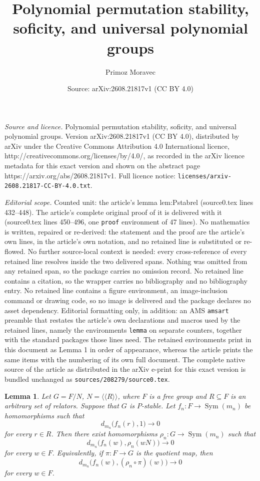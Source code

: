 \documentclass[10pt,a4paper]{amsart}
\title{Polynomial permutation stability, soficity, and universal polynomial groups}
\author{Primoz Moravec}
\date{Source: arXiv:2608.21817v1 (CC BY 4.0)}
\newtheorem{lemma}{Lemma}
\DeclareMathOperator{\Sym}{Sym}
\begin{document}
\maketitle

\noindent\emph{Source and licence.} Polynomial permutation stability, soficity, and universal polynomial groups. Version arXiv:2608.21817v1 (CC BY 4.0), distributed by arXiv under the Creative Commons Attribution 4.0 International licence, http://creativecommons.org/licenses/by/4.0/, as recorded in the arXiv licence metadata for this exact version and shown on the abstract page https://arxiv.org/abs/2608.21817v1. Full licence notice: \texttt{licenses/arxiv-2608.21817-CC-BY-4.0.txt}.\par\smallskip

\noindent\textit{Editorial scope.} Counted unit: the article's lemma lem:Pstabrel (source0.tex lines 432--448). The article's complete original proof of it is delivered with it (source0.tex lines 450--496, one \texttt{proof} environment of 47 lines). No mathematics is written, repaired or re-derived: the statement and the proof are the article's own lines, in the article's own notation, and no retained line is substituted or re-flowed.  No further source-local context is needed: every cross-reference of every retained line resolves inside the two delivered spans.  Nothing was omitted from any retained span, so the package carries no omission record.  No retained line contains a citation, so the wrapper carries no bibliography and no bibliography entry.  No retained line contains a figure environment, an image-inclusion command or drawing code, so no image is delivered and the package declares no asset dependency.  Editorial formatting only, in addition: an AMS \texttt{amsart} preamble that restates the article's own declarations and macros used by the retained lines, namely the environments \texttt{lemma} on separate counters, together with the standard packages those lines need.  The retained environments print in this document as Lemma 1 in order of appearance, whereas the article prints the same items with the numbering of its own full document.  The complete native source of the article as distributed in the arXiv e-print for this exact version is bundled unchanged as \texttt{sources/208279/source0.tex}.
\begin{lemma}
\label{lem:Pstabrel}
Let $G=F/N$, $N=\langle\!\langle R\rangle\!\rangle$,
where $F$ is a free group  and $R\subseteq F$ is an arbitrary set of relators. Suppose that $G$ is $P$-stable.
Let $f_n\colon F\to\Sym(m_n)$
be homomorphisms such that
$$d_{m_n}\bigl(f_n(r),1\bigr)\longrightarrow 0$$
for every $r\in R$.
Then there exist homomorphisms
$\rho_n\colon G\to\Sym(m_n)$
such that
$$d_{m_n}\bigl(f_n(w),\rho_n(wN)\bigr)\longrightarrow 0$$
for every $w\in F$.
Equivalently, if $\pi\colon F\to G$ is the quotient map, then
$$d_{m_n}\bigl(f_n(w),(\rho_n\circ\pi)(w)\bigr)\longrightarrow0$$
for every $w\in F$.
\end{lemma}
\end{document}
